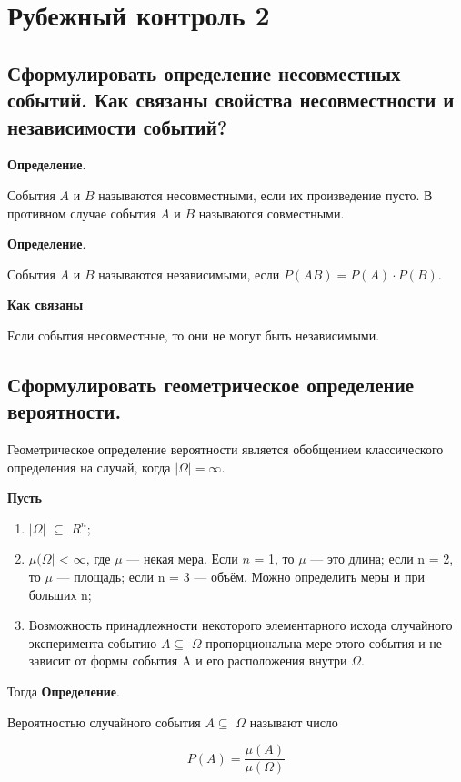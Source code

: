 \section{Рубежный контроль 2}

\subsection{Сформулировать определение несовместных событий. Как связаны свойства несовместности и независимости событий?}

\textbf{Определение}. 

События $A$ и $B$ называются несовместными, если их произведение пусто. В противном случае события $A$ и $B$ называются совместными.

\textbf{Определение}. 

События $A$ и $B$ называются независимыми, если $P(AB) = P(A) \cdot P(B)$.

\textbf{Как связаны}

Если события несовместные, то они не могут быть независимыми.

\subsection{Сформулировать геометрическое определение вероятности.}

Геометрическое определение вероятности является обобщением классического определения на случай, когда $|\Omega| = \infty$. 

\textbf{Пусть}

\begin{enumerate}
	\item $|\Omega|$ $\subseteq$ $R^n$;
	\item $\mu(\Omega|$ < $\infty$, где $\mu$ --- некая мера. Если $n$ = 1, то $\mu$ --- это длина; если n = 2, то $\mu$ --- площадь; если n = 3 --- объём. Можно определить меры и при больших n; 
	\item Возможность принадлежности некоторого элементарного исхода случайного эксперимента событию $ A \subseteq$ $\Omega$ пропорциональна мере этого события и не зависит от формы события A и его расположения внутри $\Omega$. 
	
\end{enumerate} 

Тогда \textbf{Определение}. 

Вероятностью случайного события $ A \subseteq$ $\Omega$ называют число

\begin{equation}
	P(A) = \frac{\mu(A)}{\mu(\Omega)}
\end{equation} 

